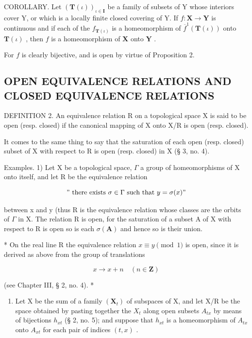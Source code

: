 COROLLARY. Let \((\mathbf{T}(\iota))_{\iota \in \mathbf{I}}\) be a family of subsets of Y whose interiors cover Y, or which is a locally finite closed covering of Y. If \(f: \mathbf{X} \to \mathbf{Y}\) is continuous and if each of the \(f_{\mathbf{T}(\iota)}\) is a homeomorphism of \(\overline{f}^1 (\mathbf{T}(\iota))\) onto \(\mathbf{T}(\iota)\) , then \(f\) is a homeomorphism of \(\mathbf{X}\) onto \(\mathbf{Y}\) .

For \(f\) is clearly bijective, and is open by virtue of Proposition 2.

\subsection{OPEN EQUIVALENCE RELATIONS AND CLOSED EQUIVALENCE RELATIONS}

DEFINITION 2. An equivalence relation R on a topological space X is said to be open (resp. closed) if the canonical mapping of X onto X/R is open (resp. closed).

It comes to the same thing to say that the saturation of each open (resp. closed) subset of X with respect to R is open (resp. closed) in X (§ 3, no. 4).

Examples. 1) Let X be a topological space, \(\Gamma\) a group of homeomorphisms of X onto itself, and let R be the equivalence relation

\[
" \text { there   exists } \sigma \in \Gamma \text { such   that } y = \sigma (x)"
\]

between x and y (thus R is the equivalence relation whose classes are the orbits of \(\Gamma\) in X. The relation R is open, for the saturation of a subset A of X with respect to R is open so is each \(\sigma(\mathbf{A})\) and hence so is their union.

* On the real line R the equivalence relation \(x \equiv y \pmod{1}\) is open, since it is derived as above from the group of translations

\[
x \rightarrow x + n \quad (n \in \mathbf {Z})
\]

(see Chapter III, § 2, no. 4). *

\begin{enumerate}
\def\labelenumi{\arabic{enumi})}
\setcounter{enumi}{1}
\tightlist
\item
  Let X be the sum of a family \((\mathbf{X}_{t})\) of subspaces of X, and let X/R be the space obtained by pasting together the \(X_{t}\) along open subsets \(A_{tx}\) by means of bijections \(h_{xt}\) (§ 2, no. 5); and suppose that \(h_{xt}\) is a homeomorphism of \(A_{tx}\) onto \(A_{xt}\) for each pair of indices \((t, x)\) .
\end{enumerate}

